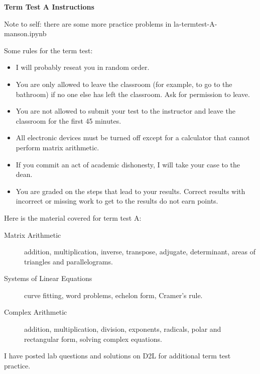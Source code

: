 \documentclass[11pt]{article}
\begin{document}
\textbf{Term Test A Instructions}

Note to self: there are some more practice problems in la-termtest-A-manson.ipynb

Some rules for the term test:
\begin{itemize}
\item I will probably reseat you in random order.
\item You are only allowed to leave the classroom (for example, to go
  to the bathroom) if no one else has left the classroom. Ask for
  permission to leave. 
\item You are not allowed to submit your test to the instructor and
  leave the classroom for the first 45 minutes.
\item All electronic devices must be turned off except for a
  calculator that cannot perform matrix arithmetic.
\item If you commit an act of academic dishonesty, I will take your
  case to the dean.
\item You are graded on the steps that lead to your results. Correct
  results with incorrect or missing work to get to the results do not
  earn points.
\end{itemize}

Here is the material covered for term test A:
\begin{description}
\item[Matrix Arithmetic] addition, multiplication, inverse, transpose,
  adjugate, determinant, areas of triangles and parallelograms.
\item[Systems of Linear Equations] curve fitting, word problems,
  echelon form, Cramer's rule.
\item[Complex Arithmetic] addition, multiplication, division,
  exponents, radicals, polar and rectangular form, solving complex
  equations.
\end{description}

I have posted lab questions and solutions on D2L for additional term
test practice.
\end{document}

